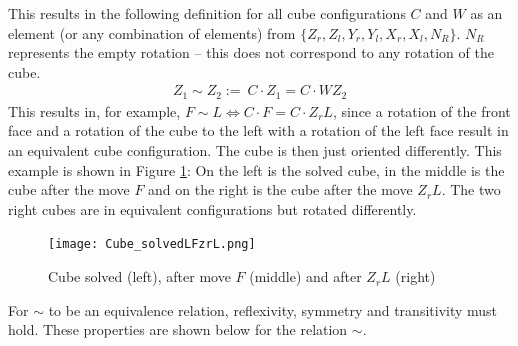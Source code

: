 \documentclass[12pt,a4paper]{article}
\theoremstyle{custom}
\begin{document}
This results in the following definition for all cube configurations $C$ and $W$ as an element (or any combination of elements) from $\{{Z_r}, {Z_l}, {Y_r}, {Y_l}, {X_r}, {X_l }, N_R\}$. $N_R$ represents the empty rotation -- this does not correspond to any rotation of the cube.
\begin{align*}
Z_1 \sim Z_2 := \ C \cdot Z_1 = C \cdot WZ_2
\end{align*}
This results in, for example, $F \sim L \Leftrightarrow C \cdot F = C \cdot Z_rL$, since a rotation of the front face and a rotation of the cube to the left with a rotation of the left face result in an equivalent cube configuration. The cube is then just oriented differently.
This example is shown in Figure \ref{Figure_Cube solved $L$ (left), after move $F$ (middle) and after $Z_rL$ (right)L}: On the left is the solved cube, in the middle is the cube after the move $F$ and on the right is the cube after the move $Z_rL$. The two right cubes are in equivalent configurations but rotated differently.
\begin{figure}[h]
\centering
\texttt{[image: Cube\_solvedLFzrL.png]}
\caption[Cube solved, after move $F$ and after $Z_rL$]{Cube solved (left), after move $F$ (middle) and after $Z_rL$ (right)}
\label{Figure_Cube solved $L$ (left), after move $F$ (middle) and after $Z_rL$ (right)L}
\end{figure}

For $\sim$ to be an equivalence relation, reflexivity, symmetry and transitivity must hold. These properties are shown below for the relation $\sim$.
\end{document}

